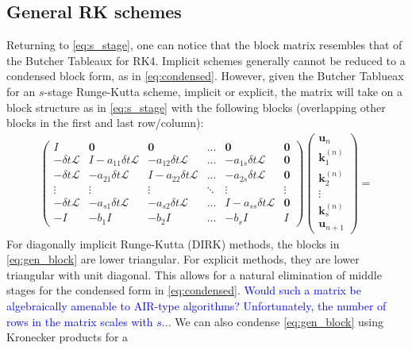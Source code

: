 \documentclass[a4paper,12pt]{article}
\newcommand{\tcb}{\textcolor{blue}}
\begin{document}
\newpage
\subsection{General RK schemes}

Returning to \eqref{eq:s_stage}, one can notice that the block matrix resembles that of the Butcher Tableaux for RK4. 
Implicit schemes generally cannot be reduced to a condensed block form, as in \eqref{eq:condensed}. However, given the Butcher
Tablueax for an $s$-stage Runge-Kutta scheme, implicit or explicit, the matrix will take on a block structure as in \eqref{eq:s_stage}
with the following blocks (overlapping other blocks in the first and last row/column):
%
\begin{align} \label{eq:gen_block}
\begin{pmatrix} 
I  & \mathbf{0} & \mathbf{0} & ... & \mathbf{0} & \mathbf{0}\\
-\delta t\mathcal{L} & I - a_{11}\delta t\mathcal{L} & -a_{12}\delta t\mathcal{L} & ... &  -a_{1s}\delta t\mathcal{L} & \mathbf{0} \\
-\delta t\mathcal{L} & -a_{21}\delta t\mathcal{L} & I -a_{22}\delta t\mathcal{L} & ... & -a_{2s}\delta t\mathcal{L} & \mathbf{0} \\ 
\vdots  & \vdots & \vdots & \ddots & \vdots  & \vdots \\
-\delta t\mathcal{L} & -a_{s1}\delta t\mathcal{L} & -a_{s2}\delta t\mathcal{L} & ...  & I - a_{ss}\delta t\mathcal{L} & \mathbf{0} \\ 
-I & -b_1I & -b_2I & ... & -b_s I & I
\end{pmatrix}
\begin{pmatrix} \mathbf{u}_n \\ \mathbf{k}_1^{(n)} \\ \mathbf{k}_2^{(n)} \\ \vdots \\ \mathbf{k}_s^{(n)} \\ \mathbf{u}_{n+1} \end{pmatrix} =
\end{align}
%
For diagonally implicit Runge-Kutta (DIRK) methods, the blocks in \eqref{eq:gen_block} are lower triangular. For explicit
methods, they are lower triangular with unit diagonal. This allows for a natural elimination of middle stages for the condensed
form in \eqref{eq:condensed}. \tcb{Would such a matrix be algebraically amenable to AIR-type algorithms? Unfortunately, the
number of rows in the matrix scales with $s$...} We can also condense \eqref{eq:gen_block} using Kronecker products for a
\end{document}

